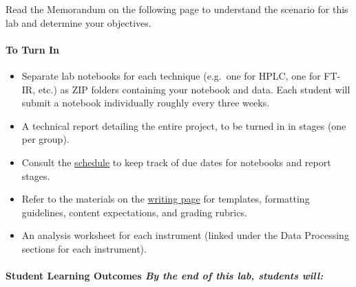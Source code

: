 \documentclass[]{tufte-book}
\providecommand{\tightlist}{%
  \setlength{\itemsep}{0pt}\setlength{\parskip}{0pt}}
\begin{document}
Read the Memorandum on the following page to understand the scenario for this lab and determine your objectives.

\hypertarget{to-turn-in}{%
\paragraph{\texorpdfstring{\textbf{To Turn In}}{To Turn In}}\label{to-turn-in}}

\begin{itemize}
\tightlist
\item
  Separate lab notebooks for each technique (e.g.~one for HPLC, one for FT-IR, etc.) as ZIP folders containing your notebook and data. Each student will submit a notebook individually roughly every three weeks.
\item
  A technical report detailing the entire project, to be turned in in stages (one per group).
\item
  Consult the \href{/chem370/schedule}{schedule} to keep track of due dates for notebooks and report stages.\\
\item
  Refer to the materials on the \href{/chem370/writing}{writing page} for templates, formatting guidelines, content expectations, and grading rubrics.
\item
  An analysis worksheet for each instrument (linked under the Data Processing sections for each instrument).
\end{itemize}

\hypertarget{student-learning-outcomes-by-the-end-of-this-lab-students-will}{%
\paragraph{\texorpdfstring{\textbf{Student Learning Outcomes} \textbar{} \emph{By the end of this lab, students will:}}{Student Learning Outcomes \textbar{} By the end of this lab, students will:}}\label{student-learning-outcomes-by-the-end-of-this-lab-students-will}}
\end{document}

